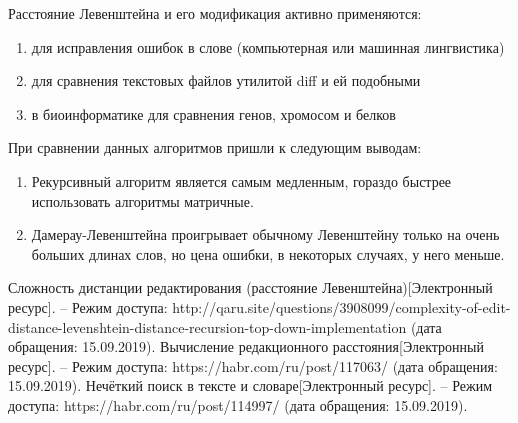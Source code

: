 \documentclass[a4paper,14pt]{article} %
\begin{document}
	Расстояние Левенштейна и его модификация активно применяются:
	\begin{enumerate}
		\item для исправления ошибок в слове (компьютерная или машинная лингвистика)
		\item для сравнения текстовых файлов утилитой diff и ей подобными
		\item в биоинформатике для сравнения генов, хромосом и белков
	\end{enumerate}
	
	\hfill
	
	При сравнении данных алгоритмов пришли к следующим выводам:
	\begin{enumerate}
 		\item Рекурсивный алгоритм является самым медленным, гораздо быстрее использовать алгоритмы матричные.   \\
 		\item Дамерау-Левенштейна проигрывает обычному Левенштейну только на очень больших длинах слов, но цена ошибки, в некоторых случаях, у него меньше.\\
	\end{enumerate}

 	\newpage

        \begin{thebibliography}{3}
		\bibitem{} Сложность дистанции редактирования (расстояние Левенштейна)[Электронный ресурс]. -- Режим доступа: http://qaru.site/questions/3908099/complexity-of-edit-distance-levenshtein-distance-recursion-top-down-implementation (дата обращения: 15.09.2019).
		\bibitem{} Вычисление редакционного расстояния[Электронный ресурс]. -- Режим доступа: https://habr.com/ru/post/117063/ (дата обращения: 15.09.2019).
		\bibitem{} Нечёткий поиск в тексте и словаре[Электронный ресурс]. -- Режим доступа: https://habr.com/ru/post/114997/ (дата обращения: 15.09.2019).
	\end{thebibliography}
\end{document}
